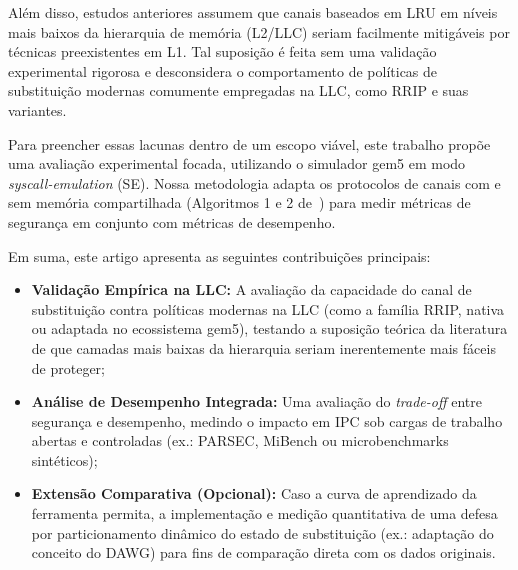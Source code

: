 Além disso, estudos anteriores assumem que canais baseados em LRU em níveis mais baixos da hierarquia de memória (L2/LLC) seriam facilmente mitigáveis por técnicas preexistentes em L1. Tal suposição é feita sem uma validação experimental rigorosa e desconsidera o comportamento de políticas de substituição modernas comumente empregadas na LLC, como RRIP e suas variantes.

Para preencher essas lacunas dentro de um escopo viável, este trabalho propõe uma avaliação experimental focada, utilizando o simulador gem5 em modo \textit{syscall-emulation} (SE). Nossa metodologia adapta os protocolos de canais com e sem memória compartilhada (Algoritmos 1 e 2 de~\cite{9354935}) para medir métricas de segurança em conjunto com métricas de desempenho. 

Em suma, este artigo apresenta as seguintes contribuições principais:
\begin{itemize}
    \item \textbf{Validação Empírica na LLC:} A avaliação da capacidade do canal de substituição contra políticas modernas na LLC (como a família RRIP, nativa ou adaptada no ecossistema gem5), testando a suposição teórica da literatura de que camadas mais baixas da hierarquia seriam inerentemente mais fáceis de proteger;
    \item \textbf{Análise de Desempenho Integrada:} Uma avaliação do \textit{trade-off} entre segurança e desempenho, medindo o impacto em IPC sob cargas de trabalho abertas e controladas (ex.: PARSEC, MiBench ou microbenchmarks sintéticos);
    \item \textbf{Extensão Comparativa (Opcional):} Caso a curva de aprendizado da ferramenta permita, a implementação e medição quantitativa de uma defesa por particionamento dinâmico do estado de substituição (ex.: adaptação do conceito do DAWG) para fins de comparação direta com os dados originais.
\end{itemize}